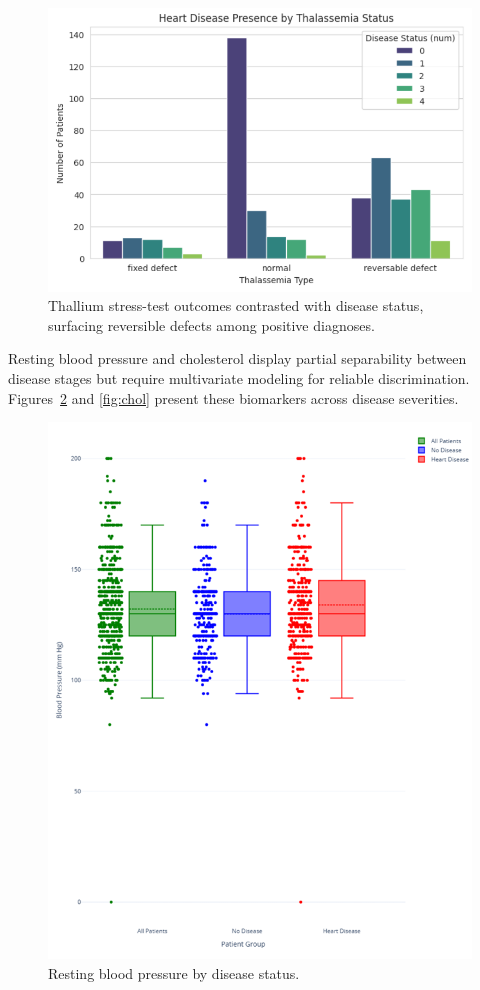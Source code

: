 \documentclass[12pt]{article}
\begin{document}
\begin{figure}[t]
  \centering
  \includegraphics[width=0.85\linewidth]{thallium_test_results_vs_disease_status.png}
  \caption{Thallium stress-test outcomes contrasted with disease status, surfacing reversible defects among positive diagnoses.}
  \label{fig:thal_results}
\end{figure}

Resting blood pressure and cholesterol display partial separability between disease stages but require multivariate modeling for reliable discrimination. Figures~\ref{fig:bp} and \ref{fig:chol} present these biomarkers across disease severities.

\begin{figure}[t]
  \centering
  \includegraphics[width=0.85\linewidth]{resting_blood_pressure_by_disease_status.png}
  \caption{Resting blood pressure by disease status.}
  \label{fig:bp}
\end{figure}
\end{document}
